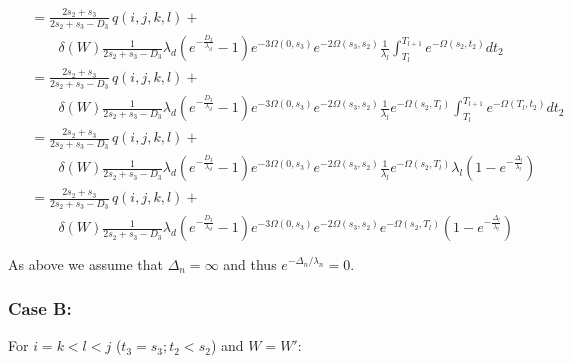 \documentclass{article}
\begin{document}
\begin{align}
    \begin{split}
        &= \frac{2s_2+s_3}{2s_2+s_3-D_3}\,q(i,j,k,l) +\\
        &\qquad
        \delta(W)\frac{1}{2s_2+s_3-D_3}
        \lambda_d\left(e^{-\frac{D_3}{\lambda_d}}-1\right)
        e^{-3\Omega(0,s_3)}e^{-2\Omega(s_3,s_2)}\frac{1}{\lambda_l}\int_{T_l}^{T_{l+1}}e^{-\Omega(s_2,t_2)}dt_2\\
        &= \frac{2s_2+s_3}{2s_2+s_3-D_3}\,q(i,j,k,l) +\\
        &\qquad
        \delta(W)\frac{1}{2s_2+s_3-D_3}
        \lambda_d\left(e^{-\frac{D_3}{\lambda_d}}-1\right)
        e^{-3\Omega(0,s_3)}e^{-2\Omega(s_3,s_2)}\frac{1}{\lambda_l}e^{-\Omega(s_2,T_l)}\int_{T_l}^{T_{l+1}}e^{-\Omega(T_l,t_2)}dt_2\\
        &= \frac{2s_2+s_3}{2s_2+s_3-D_3}\,q(i,j,k,l) +\\
        &\qquad
        \delta(W)\frac{1}{2s_2+s_3-D_3}
        \lambda_d\left(e^{-\frac{D_3}{\lambda_d}}-1\right)
        e^{-3\Omega(0,s_3)}e^{-2\Omega(s_3,s_2)}\frac{1}{\lambda_l}e^{-\Omega(s_2,T_l)}\lambda_l\left(1-e^{-\frac{\Delta_l}{\lambda_l}}\right)\\
        &= \frac{2s_2+s_3}{2s_2+s_3-D_3}\,q(i,j,k,l) +\\
        &\qquad
        \delta(W)\frac{1}{2s_2+s_3-D_3}
        \lambda_d\left(e^{-\frac{D_3}{\lambda_d}}-1\right)
        e^{-3\Omega(0,s_3)}e^{-2\Omega(s_3,s_2)}e^{-\Omega(s_2,T_l)}\left(1-e^{-\frac{\Delta_l}{\lambda_l}}\right)\\
    \end{split}
\end{align}
As above we assume that $\Delta_n = \infty$ and thus $e^{-\Delta_n/\lambda_n} = 0$.

\subsubsection{Case B:}
For $i=k<l<j$ ($t_3=s_3; t_2<s_2$) and $W = W'$:
\end{document}
